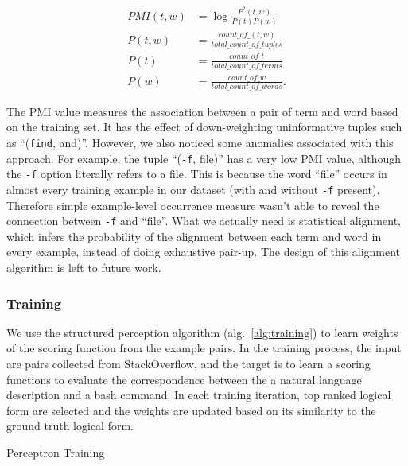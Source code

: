 \begin{align}
	PMI(t, w) &= \log{\frac{P^2(t,w)}{P(t)P(w)}} \\
	P(t, w) &= \frac{count\_of\_(t,w)}{total\_count\_of\_tuples} \\
	P(t) &= \frac{count\_of\_t}{total\_count\_of\_terms} \\
	P(w) &= \frac{count\_of\_w}{total\_count\_of\_words}.
\end{align}

The PMI value measures the association between a pair of term and word based on the training set. It has the effect of down-weighting uninformative tuples such as ``(\texttt{find}, and)''. However, we also noticed some anomalies associated with this approach. For example, the tuple ``(\texttt{-f}, file)'' has a very low PMI value, although the \texttt{-f} option literally refers to a file. This is because the word ``file'' occurs in almost every training example in our dataset (with and without \texttt{-f} present). Therefore simple example-level occurrence measure wasn't able to reveal the connection between \texttt{-f} and ``file''. What we actually need is statistical alignment, which infers the probability of the alignment between each term and word in every example, instead of doing exhaustive pair-up. The design of this alignment algorithm is left to future work.

\subsubsection{Training}
\label{subsec:training}

We use the structured perception algorithm (alg.~\ref{alg:training}) to learn weights of the scoring function from the example pairs. In the training process, the input are pairs collected from StackOverflow, and the target is to learn a scoring functions to evaluate the correspondence between the a natural language description and a bash command. In each training iteration, top ranked logical form are selected and the weights are updated based on its similarity to the ground truth logical form.

\begin{algorithm}
\caption{Perceptron Training\label{alg:training}}
\end{algorithm}